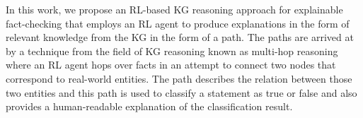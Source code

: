 


In this work, we propose an RL-based KG reasoning approach for explainable fact-checking that employs an RL agent to produce explanations in the form of relevant knowledge from the KG in the form of a path. The paths are arrived at by a technique from the field of KG reasoning known as multi-hop reasoning where an RL agent hops over facts in an attempt to connect two nodes %
that correspond to real-world entities. The path describes the relation between those two entities %
and this path is used to classify a statement as true or false and also provides a human-readable explanation of the classification result. %

